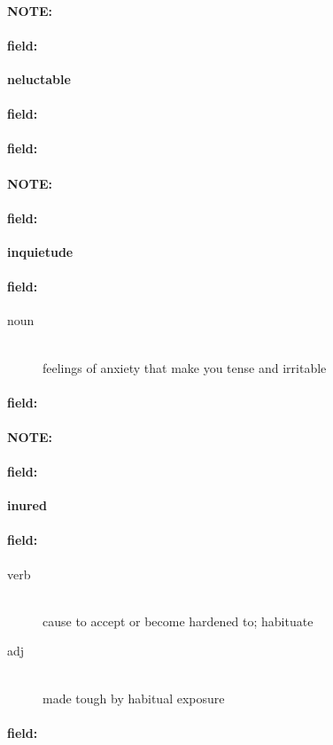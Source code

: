 \documentclass[12pt]{article}
\newenvironment{note}{\paragraph{NOTE:}}{}
\newenvironment{field}{\paragraph{field:}}{}
\begin{document}
\begin{note}
\begin{field}
\textbf{\large neluctable}
\end{field}


\begin{field}
\end{field}

\begin{field}
\end{field}
\end{note}
\begin{note}
\begin{field}
\textbf{\large inquietude}
\end{field}


\begin{field}
\begin{description}
\item[noun] \hfill \\ 
feelings of anxiety that make you tense and irritable

\end{description}
\end{field}

\begin{field}
\end{field}
\end{note}
\begin{note}
\begin{field}
\textbf{\large inured}
\end{field}


\begin{field}
\begin{description}
\item[verb] \hfill \\ 
cause to accept or become hardened to; habituate

\item[adj] \hfill \\ 
made tough by habitual exposure

\end{description}
\end{field}

\begin{field}
\end{field}
\end{note}
\end{document}

